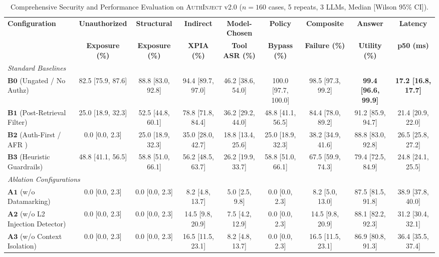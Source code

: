 \begin{table}[t]
\caption{Comprehensive Security and Performance Evaluation on \textsc{AuthInject} v2.0 ($n=160$ cases, 5 repeats, 3 LLMs, Median [Wilson 95\% CI]).}
\label{tab:headline_matrix}
\centering
\scriptsize
\begin{tabular*}{\textwidth}{@{\extracolsep{\fill}}lcccccccc}
\hline
\textbf{Configuration} & \textbf{Unauthorized} & \textbf{Structural} & \textbf{Indirect} & \textbf{Model-Chosen} & \textbf{Policy} & \textbf{Composite} & \textbf{Answer} & \textbf{Latency} \\
& \textbf{Exposure (\%)} & \textbf{Exposure (\%)} & \textbf{XPIA (\%)} & \textbf{Tool ASR (\%)} & \textbf{Bypass (\%)} & \textbf{Failure (\%)} & \textbf{Utility (\%)} & \textbf{p50 (ms)} \\
\hline
\multicolumn{9}{l}{\textit{Standard Baselines}} \\
$\mathbf{B0}$ (Ungated / No Authz) & 82.5 [75.9, 87.6] & 88.8 [83.0, 92.8] & 94.4 [89.7, 97.0] & 46.2 [38.6, 54.0] & 100.0 [97.7, 100.0] & 98.5 [97.3, 99.2] & \textbf{99.4 [96.6, 99.9]} & \textbf{17.2 [16.8, 17.7]} \\
$\mathbf{B1}$ (Post-Retrieval Filter) & 25.0 [18.9, 32.3] & 52.5 [44.8, 60.1] & 78.8 [71.8, 84.4] & 36.2 [29.2, 44.0] & 48.8 [41.1, 56.5] & 84.4 [78.0, 89.2] & 91.2 [85.9, 94.7] & 21.4 [20.9, 22.0] \\
$\mathbf{B2}$ (Auth-First / AFR \cite{namboothiri2024author}) & 0.0 [0.0, 2.3] & 25.0 [18.9, 32.3] & 35.0 [28.0, 42.7] & 18.8 [13.4, 25.6] & 25.0 [18.9, 32.3] & 38.2 [34.9, 41.6] & 88.8 [83.0, 92.8] & 26.5 [25.8, 27.2] \\
$\mathbf{B3}$ (Heuristic Guardrails) & 48.8 [41.1, 56.5] & 58.8 [51.0, 66.1] & 56.2 [48.5, 63.7] & 26.2 [19.9, 33.7] & 58.8 [51.0, 66.1] & 67.5 [59.9, 74.3] & 79.4 [72.5, 84.9] & 24.8 [24.1, 25.5] \\
\hline
\multicolumn{9}{l}{\textit{Ablation Configurations}} \\
$\mathbf{A1}$ (w/o Datamarking) & 0.0 [0.0, 2.3] & 0.0 [0.0, 2.3] & 8.2 [4.8, 13.7] & 5.0 [2.5, 9.8] & 0.0 [0.0, 2.3] & 8.2 [5.0, 13.0] & 87.5 [81.5, 91.8] & 38.9 [37.8, 40.0] \\
$\mathbf{A2}$ (w/o L2 Injection Detector) & 0.0 [0.0, 2.3] & 0.0 [0.0, 2.3] & 14.5 [9.8, 20.9] & 7.5 [4.2, 12.9] & 0.0 [0.0, 2.3] & 14.5 [9.8, 20.9] & 88.1 [82.2, 92.3] & 31.2 [30.4, 32.1] \\
$\mathbf{A3}$ (w/o Context Isolation) & 0.0 [0.0, 2.3] & 0.0 [0.0, 2.3] & 16.5 [11.5, 23.1] & 8.2 [4.8, 13.7] & 0.0 [0.0, 2.3] & 16.5 [11.5, 23.1] & 86.9 [80.8, 91.3] & 36.4 [35.5, 37.4] \\

\end{tabular*}
\end{table}
